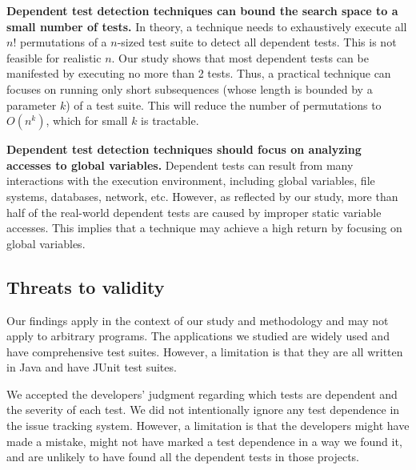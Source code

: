 \vspace{1mm}
\noindent \textbf{Dependent test detection techniques
can bound the search space to a small number of tests.}
In theory, a technique needs to exhaustively execute
all $n!$ permutations of a $n$-sized
test suite to detect all dependent tests. This is
not feasible for realistic $n$.  Our study shows that
most dependent tests can be manifested by executing
no more than 2 tests. Thus, a practical technique
can focuses on running only short subsequences (whose
length is bounded by a parameter $k$)
of a test suite. This will reduce the number of permutations
to $O(n^k)$, which for small $k$ is tractable.

\vspace{1mm}
\noindent \textbf{Dependent test detection techniques
should focus on analyzing accesses to global variables.}
Dependent tests can result from many
interactions with the execution environment, including
global variables, file systems, databases, network, etc.
However, as reflected by our study, more than half of the
real-world dependent tests are caused
by improper static variable accesses. This implies that a technique
may achieve a high return by focusing on global variables.




\subsection{Threats to validity}

Our findings apply in the context of our study and methodology and may not
apply to arbitrary programs.
The applications we studied are widely used and have comprehensive test suites.
However, a limitation is that they are all written in 
Java and have JUnit test suites.  

We accepted the developers' judgment regarding which tests are dependent
and the severity of each test.  We did not intentionally ignore
any test dependence in the issue tracking system.
However, a limitation is that the developers might have made a mistake,
might not have marked a test dependence in a way we found it, and are
unlikely to have found all the dependent tests in those projects. 


